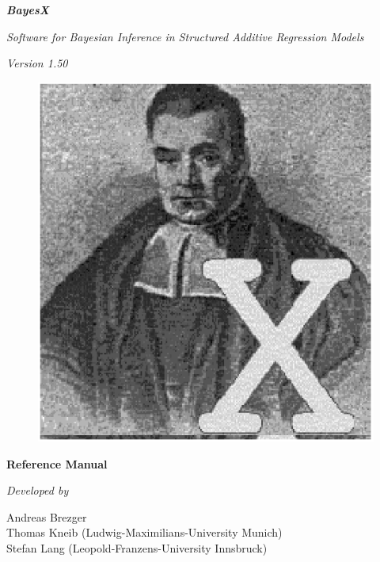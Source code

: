 
\thispagestyle{empty}

\begin{center}
{\bf \em \huge BayesX}

\vspace{0.5cm}

{\em \large Software for Bayesian Inference in Structured Additive
Regression Models}

\vspace{0.5cm}

{\em Version 1.50}

\vspace{0.5cm}

\begin{figure}[h]
\begin{center}
\includegraphics[scale=1.2]{grafiken/bayesicon.eps}
\end{center}
\end{figure}

\vfill

{\bf\sffamily \huge Reference Manual}

\vfill

\end{center}

{\em Developed by}

Andreas Brezger\\
Thomas Kneib (Ludwig-Maximilians-University Munich)\\
Stefan Lang (Leopold-Franzens-University Innsbruck)\\

